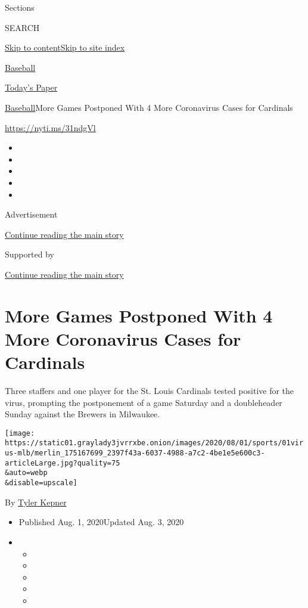 Sections

SEARCH

\protect\hyperlink{site-content}{Skip to
content}\protect\hyperlink{site-index}{Skip to site index}

\href{https://www.nytimes3xbfgragh.onion/section/sports/baseball}{Baseball}

\href{https://myaccount.nytimes3xbfgragh.onion/auth/login?response_type=cookie\&client_id=vi}{}

\href{https://www.nytimes3xbfgragh.onion/section/todayspaper}{Today's
Paper}

\href{/section/sports/baseball}{Baseball}\textbar{}More Games Postponed
With 4 More Coronavirus Cases for Cardinals

\url{https://nyti.ms/31ndgVl}

\begin{itemize}
\item
\item
\item
\item
\item
\end{itemize}

Advertisement

\protect\hyperlink{after-top}{Continue reading the main story}

Supported by

\protect\hyperlink{after-sponsor}{Continue reading the main story}

\hypertarget{more-games-postponed-with-4-more-coronavirus-cases-for-cardinals}{%
\section{More Games Postponed With 4 More Coronavirus Cases for
Cardinals}\label{more-games-postponed-with-4-more-coronavirus-cases-for-cardinals}}

Three staffers and one player for the St. Louis Cardinals tested
positive for the virus, prompting the postponement of a game Saturday
and a doubleheader Sunday against the Brewers in Milwaukee.

\texttt{[image: https://static01.graylady3jvrrxbe.onion/images/2020/08/01/sports/01virus-mlb/merlin\_175167699\_2397f43a-6037-4988-a7c2-4be1e5e600c3-articleLarge.jpg?quality=75\\\&auto=webp\\\&disable=upscale]}

By \href{https://www.nytimes3xbfgragh.onion/by/tyler-kepner}{Tyler
Kepner}

\begin{itemize}
\item
  Published Aug. 1, 2020Updated Aug. 3, 2020
\item
  \begin{itemize}
  \item
  \item
  \item
  \item
  \item
  \end{itemize}
\end{itemize}

